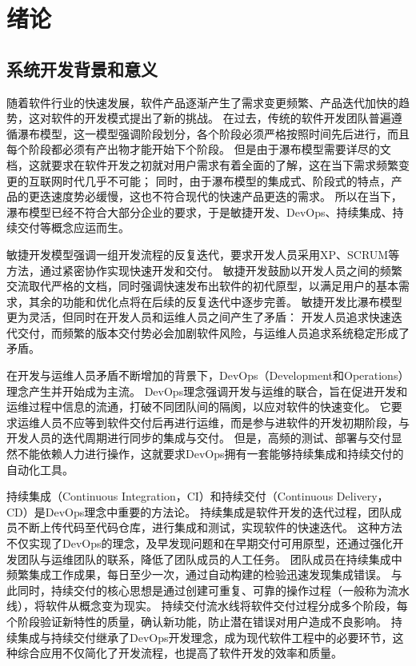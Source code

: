 
\chapter{绪论}

\section{系统开发背景和意义}
随着软件行业的快速发展，软件产品逐渐产生了需求变更频繁、产品迭代加快的趋势，这对软件的开发模式提出了新的挑战。
在过去，传统的软件开发团队普遍遵循瀑布模型，这一模型强调阶段划分，各个阶段必须严格按照时间先后进行，而且每个阶段都必须有产出物才能开始下个阶段\cite{瀑布模型}。
但是由于瀑布模型需要详尽的文档，这就要求在软件开发之初就对用户需求有着全面的了解，这在当下需求频繁变更的互联网时代几乎不可能；
同时，由于瀑布模型的集成式、阶段式的特点，产品的更迭速度势必缓慢，这也不符合现代的快速产品更迭的需求。
所以在当下，瀑布模型已经不符合大部分企业的要求，于是敏捷开发、DevOps、持续集成、持续交付等概念应运而生。

敏捷开发模型强调一组开发流程的反复迭代，要求开发人员采用XP、SCRUM等方法，通过紧密协作实现快速开发和交付。
敏捷开发鼓励以开发人员之间的频繁交流取代严格的文档，同时强调快速发布出软件的初代原型，以满足用户的基本需求，其余的功能和优化点将在后续的反复迭代中逐步完善\cite{敏捷开发}。
敏捷开发比瀑布模型更为灵活，但同时在开发人员和运维人员之间产生了矛盾：
开发人员追求快速迭代交付，而频繁的版本交付势必会加剧软件风险，与运维人员追求系统稳定形成了矛盾。

在开发与运维人员矛盾不断增加的背景下，DevOps（Development和Operations）理念产生并开始成为主流。
DevOps理念强调开发与运维的联合，旨在促进开发和运维过程中信息的流通，打破不同团队间的隔阂，以应对软件的快速变化\cite{DevOps}。
它要求运维人员不应等到软件交付后再进行运维，而是参与进软件的开发初期阶段，与开发人员的迭代周期进行同步的集成与交付。
但是，高频的测试、部署与交付显然不能依赖人力进行操作，这就要求DevOps拥有一套能够持续集成和持续交付的自动化工具。

持续集成（Continuous Integration，CI）和持续交付（Continuous Delivery，CD）是DevOps理念中重要的方法论。
持续集成是软件开发的迭代过程，团队成员不断上传代码至代码仓库，进行集成和测试，实现软件的快速迭代\cite{绪论持续集成1}。
这种方法不仅实现了DevOps的理念，及早发现问题和在早期交付可用原型，还通过强化开发团队与运维团队的联系，降低了团队成员的人工任务。
团队成员在持续集成中频繁集成工作成果，每日至少一次，通过自动构建的检验迅速发现集成错误。
与此同时，持续交付的核心思想是通过创建可重复、可靠的操作过程（一般称为流水线），将软件从概念变为现实\cite{绪论持续集成2}。
持续交付流水线将软件交付过程分成多个阶段，每个阶段验证新特性的质量，确认新功能，防止潜在错误对用户造成不良影响。
持续集成与持续交付继承了DevOps开发理念，成为现代软件工程中的必要环节，这种综合应用不仅简化了开发流程，也提高了软件开发的效率和质量。

